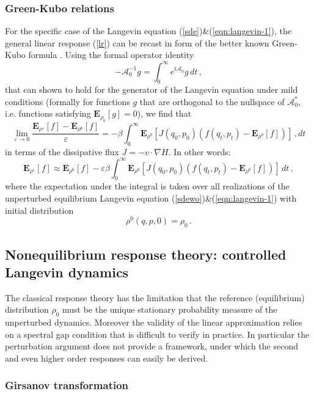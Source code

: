 \documentclass[]{tMPH2e}
\newcommand{\eps}{\varepsilon}
\newcommand{\cA}{\mathcal A}
\newcommand{\bE}{{\mathbf E}}
\begin{document}
\subsubsection*{Green-Kubo relations} 
For the specific case of the Langevin equation (\ref{sde})\&(\ref{eqn:langevin-1}), the general linear response (\ref{lr}) can be recast in form of the better known Green-Kubo formula \cite{marconi2008,risken1996}. Using the formal operator identity 
\[
-\cA_{0}^{-1} g = \int_{0}^{\infty}e^{t\cA_{0}}g \,dt\,,
\]
that can shown to hold for the generator of the Langevin equation under mild conditions (formally for functions $g$ that are orthogonal to the nullspace of $\cA_{0}^{*}$, i.e. functions satisfying $\bE_{\rho_{0}}[g]=0$), we find that 
\begin{equation}\label{GreenKubo}
\lim_{\eps\to 0}\frac{\bE_{\rho^{\eps}}[f] - \bE_{\rho^{0}}[f]}{\eps} = -\beta\int_{0}^{\infty}\bE_{\rho^{0}}[J(q_{0},p_{0}) (f(q_{t},p_{t})-\bE_{\rho^{0}}[f])]\,,dt
\end{equation}
in terms of the dissipative flux $J=-v\cdot\nabla H$. In other words: 
\[
\bE_{\rho^{\eps}}[f] \approx \bE_{\rho^{0}}[f] - \eps\beta\int_{0}^{\infty}\bE_{\rho^{0}}[J(q_{0},p_{0}) (f(q_{t},p_{t})-\bE_{\rho^{0}}[f])]\,dt\,,
\]
 where the expectation under the integral is taken over all realizations of the unperturbed equilibrium Langevin equation (\ref{sdewo})\&(\ref{eqn:langevin-1}) with initial distribution 
 \[
 \rho^{0}(q,p,0)=\rho_{0}\,.
 \]



\subsection{Nonequilibrium response theory: controlled Langevin dynamics}

The classical response theory has the limitation that the reference (equilibrium) distribution $\rho_{0}$ must be the unique stationary probability measure of the unperturbed dynamics. Moreover the validity of the linear approximation relies on a spectral gap condition that is difficult to verify in practice. In particular the perturbation argument does not provide a framework, under which the second and even higher order responses can easily be derived. 

\subsubsection*{Girsanov transformation}
\end{document}
